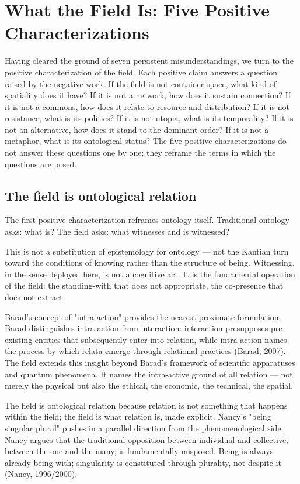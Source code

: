 \section{What the Field Is: Five Positive Characterizations}

Having cleared the ground of seven persistent misunderstandings, we turn to the positive characterization of the field. Each positive claim answers a question raised by the negative work. If the field is not container-space, what kind of spatiality does it have? If it is not a network, how does it sustain connection? If it is not a commons, how does it relate to resource and distribution? If it is not resistance, what is its politics? If it is not utopia, what is its temporality? If it is not an alternative, how does it stand to the dominant order? If it is not a metaphor, what is its ontological status? The five positive characterizations do not answer these questions one by one; they reframe the terms in which the questions are posed.

\subsection{The field is ontological relation}

The first positive characterization reframes ontology itself. Traditional ontology asks: what is? The field asks: what witnesses and is witnessed?

This is not a substitution of epistemology for ontology — not the Kantian turn toward the conditions of knowing rather than the structure of being. Witnessing, in the sense deployed here, is not a cognitive act. It is the fundamental operation of the field: the standing-with that does not appropriate, the co-presence that does not extract.

Barad's concept of "intra-action" provides the nearest proximate formulation. Barad distinguishes intra-action from interaction: interaction presupposes pre-existing entities that subsequently enter into relation, while intra-action names the process by which relata emerge through relational practices (Barad, 2007). The field extends this insight beyond Barad's framework of scientific apparatuses and quantum phenomena. It names the intra-active ground of all relation — not merely the physical but also the ethical, the economic, the technical, the spatial.

The field is ontological relation because relation is not something that happens within the field; the field is what relation is, made explicit. Nancy's "being singular plural" pushes in a parallel direction from the phenomenological side. Nancy argues that the traditional opposition between individual and collective, between the one and the many, is fundamentally misposed. Being is always already being-with; singularity is constituted through plurality, not despite it (Nancy, 1996/2000).

